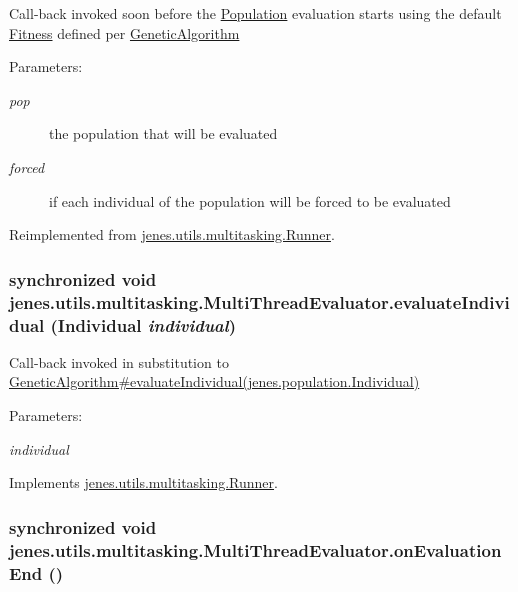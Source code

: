 Call-back invoked soon before the \hyperlink{}{Population} evaluation starts using the default \hyperlink{}{Fitness} defined per \hyperlink{}{GeneticAlgorithm}

\begin{Desc}
\item[Parameters:]
\begin{description}
\item[{\em pop}]the population that will be evaluated \item[{\em forced}]if each individual of the population will be forced to be evaluated \end{description}
\end{Desc}


Reimplemented from \hyperlink{classjenes_1_1utils_1_1multitasking_1_1_runner_6ec13cf0fb2ff03461a3a397421505cf}{jenes.utils.multitasking.Runner}.\hypertarget{classjenes_1_1utils_1_1multitasking_1_1_multi_thread_evaluator_d99c13b137f1089a9f30377548b42e25}{
\subsubsection[evaluateIndividual]{\setlength{\rightskip}{0pt plus 5cm}synchronized void jenes.utils.multitasking.MultiThreadEvaluator.evaluateIndividual (Individual {\em individual})}}
\label{classjenes_1_1utils_1_1multitasking_1_1_multi_thread_evaluator_d99c13b137f1089a9f30377548b42e25}


Call-back invoked in substitution to \hyperlink{}{GeneticAlgorithm\#evaluateIndividual(jenes.population.Individual)} \begin{Desc}
\item[Parameters:]
\begin{description}
\item[{\em individual}]\end{description}
\end{Desc}


Implements \hyperlink{classjenes_1_1utils_1_1multitasking_1_1_runner_250c5e0ffdb86ef0bb0e78e625a449e7}{jenes.utils.multitasking.Runner}.\hypertarget{classjenes_1_1utils_1_1multitasking_1_1_multi_thread_evaluator_3cd56b43989da43e4b3c2b79260d5f5f}{
\subsubsection[onEvaluationEnd]{\setlength{\rightskip}{0pt plus 5cm}synchronized void jenes.utils.multitasking.MultiThreadEvaluator.onEvaluationEnd ()}}
\label{classjenes_1_1utils_1_1multitasking_1_1_multi_thread_evaluator_3cd56b43989da43e4b3c2b79260d5f5f}


